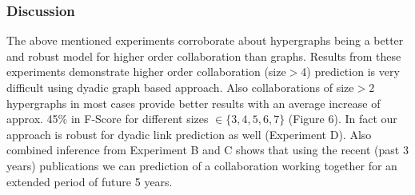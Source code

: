 \documentclass{sig-alternate}
\begin{document}

\subsubsection{Discussion}

The above mentioned experiments corroborate about hypergraphs being a better and robust model for higher order collaboration than graphs. Results from these experiments demonstrate higher order collaboration (size$>$4) prediction is very difficult using dyadic graph based approach. Also collaborations of size$>2$ hypergraphs in most cases provide better results with an average increase of approx. 45\% in F-Score for different sizes $\in \{3,4,5,6,7\}$ (Figure 6). In fact our approach is robust for dyadic link prediction as well (Experiment D). Also combined inference from Experiment B and C shows that using the recent (past 3 years) publications we can prediction of a collaboration working together for an extended period of future 5 years. 



%
\end{document}

